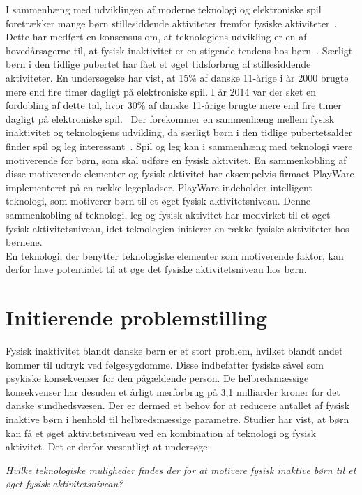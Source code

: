 I sammenhæng med udviklingen af moderne teknologi og elektroniske spil foretrækker mange børn stillesiddende aktiviteter fremfor fysiske aktiviteter~\citep{Universitet2014}. Dette har medført en konsensus om, at teknologiens udvikling er en af hovedårsagerne til, at fysisk inaktivitet er en stigende tendens hos børn~\citep{Kiens2007}.
Særligt børn i den tidlige pubertet har fået et øget tidsforbrug af stillesiddende aktiviteter. En undersøgelse har vist, at 15\% af danske 11-årige i år 2000 brugte mere end fire timer dagligt på elektroniske spil. I år 2014 var der sket en fordobling af dette tal, hvor 30\% af danske 11-årige brugte mere end fire timer dagligt på elektroniske spil.~\citep{Universitet2014} \newline
Der forekommer en sammenhæng mellem fysisk inaktivitet og teknologiens udvikling, da særligt børn i den tidlige pubertetsalder finder spil og leg interessant~\citep{Wied2011}. Spil og leg kan i sammenhæng med teknologi være motiverende for børn, som skal udføre en fysisk aktivitet. En sammenkobling af disse motiverende elementer og fysisk aktivitet har eksempelvis firmaet PlayWare implementeret på en række legepladser. PlayWare indeholder intelligent teknologi, som motiverer børn til et øget fysisk aktivitetsniveau. Denne sammenkobling af teknologi, leg og fysisk aktivitet har medvirket til et øget fysisk aktivitetsniveau, idet teknologien initierer en række fysiske aktiviteter hos børnene.~\citep{Rishoej2010} \\
En teknologi, der benytter teknologiske elementer som motiverende faktor, kan derfor have potentialet til at øge det fysiske aktivitetsniveau hos børn.

\section{Initierende problemstilling}
Fysisk inaktivitet blandt danske børn er et stort problem, hvilket blandt andet kommer til udtryk ved følgesygdomme. Disse indbefatter fysiske såvel som psykiske konsekvenser for den pågældende person. De helbredsmæssige konsekvenser har desuden et årligt merforbrug på 3,1 milliarder kroner for det danske sundhedsvæsen. Der er dermed et behov for at reducere antallet af fysisk inaktive børn i henhold til helbredsmæssige parametre. Studier har vist, at børn kan få et øget aktivitetsniveau ved en kombination af teknologi og fysisk aktivitet. Det er derfor væsentligt at undersøge: 

\begin{center}
\textit{Hvilke teknologiske muligheder findes der for at motivere fysisk inaktive børn til et øget fysisk aktivitetsniveau?}
\end{center}
